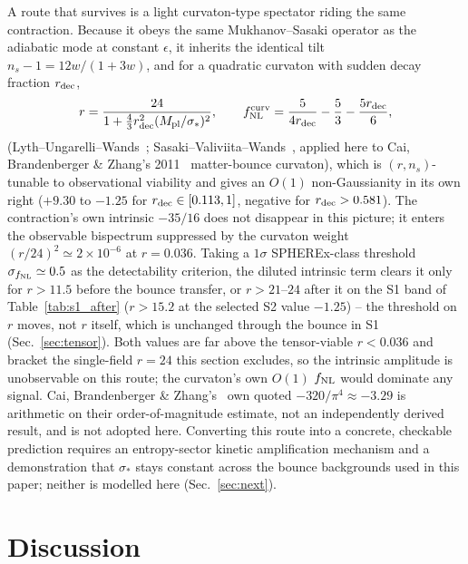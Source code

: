 \documentclass[aps,prd,twocolumn,superscriptaddress,nofootinbib,longbibliography]{revtex4-2}
\newcommand{\fnl}{f_{\rm NL}}
\begin{document}
A route that survives is a light curvaton-type spectator riding the
same contraction. Because it obeys the same Mukhanov--Sasaki operator
as the adiabatic mode at constant $\epsilon$, it inherits the identical
tilt $n_s-1=12w/(1+3w)$, and for a quadratic curvaton with sudden decay
fraction $r_{\rm dec}$,
\begin{equation}
r=\frac{24}{1+\frac{4}{3}r_{\rm dec}^2(M_{\rm pl}/\sigma_*)^2},\qquad
\fnl^{\rm curv}=\frac{5}{4r_{\rm dec}}-\frac{5}{3}-\frac{5r_{\rm dec}}{6},
\end{equation}
(Lyth--Ungarelli--Wands~\cite{LythUngarelliWands2003};
Sasaki--Valiviita--Wands~\cite{SasakiValiviitaWands2006}, applied here to
Cai, Brandenberger \& Zhang's 2011~\cite{CaiXue2011} matter-bounce
curvaton), which is $(r,n_s)$-tunable to observational viability and
gives an $O(1)$ non-Gaussianity in its own right ($+9.30$ to $-1.25$ for
$r_{\rm dec}\in[0.113,1]$, negative for $r_{\rm dec}>0.581$). The
contraction's own intrinsic
$-35/16$ does not disappear in this picture; it enters the observable
bispectrum suppressed by the curvaton weight $(r/24)^2\simeq2\times10^{-6}$
at $r=0.036$. Taking a $1\sigma$ SPHEREx-class threshold
$\sigma_{\fnl}\simeq0.5$ as the detectability criterion, the diluted
intrinsic term clears it only for $r>11.5$ before the bounce transfer,
or $r>21$--$24$ after it on the S1 band of
Table~\ref{tab:s1_after} ($r>15.2$ at the selected S2 value $-1.25$) -- the threshold on $r$ moves, not $r$ itself, which
is unchanged through the bounce in S1 (Sec.~\ref{sec:tensor}). Both
values are far above the tensor-viable $r<0.036$ and bracket the
single-field $r=24$ this section excludes, so the intrinsic amplitude is
unobservable on this route; the curvaton's own $O(1)$ $\fnl$ would
dominate any signal. Cai, Brandenberger \& Zhang's~\cite{CaiXue2011}
own quoted $-320/\pi^4\approx-3.29$ is arithmetic on their order-of-magnitude
estimate, not an independently derived result, and is not adopted here.
Converting this route into a concrete, checkable prediction requires an
entropy-sector kinetic amplification mechanism and a demonstration that
$\sigma_*$ stays constant across the bounce backgrounds used in this
paper; neither is modelled here (Sec.~\ref{sec:next}).

\section{Discussion}
\label{sec:discussion}
\end{document}
